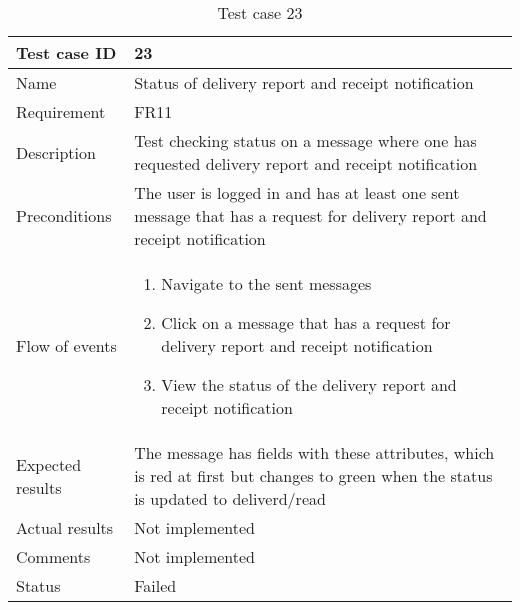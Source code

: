 		\begin{table}
			\begin{tabular}{l|p{10cm}}
				Test case ID & 23 \\ \hline
				Name & Status of delivery report and receipt notification\\ \hline
				Requirement &FR11\\ \hline
				Description & Test checking status on a message where one has requested delivery report and receipt notification\\ \hline
				Preconditions & The user is logged in and has at least one sent message that has a request for delivery report and receipt notification\\ \hline
				Flow of events & 
					\begin{enumerate}
						\item{}Navigate to the sent messages
						\item{}Click on a message that has a request for delivery report and receipt notification
						\item{}View the status of the delivery report and receipt notification
					\end{enumerate} \\ \hline
				Expected results & The message has fields with these attributes, which is red at first but changes to green when the status is updated to deliverd/read \\ \hline
				Actual results &Not implemented\\ \hline
				Comments & Not implemented\\ \hline
				Status & Failed\\ \hline
			\end{tabular}
			\caption{Test case 23} \label{tab:case23}
		\end{table}


